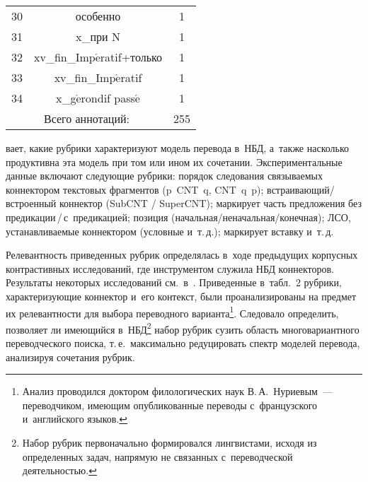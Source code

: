 \begin{multicols}{2}
\begin{center}
{\begin{tabular}{|c|c|c|}
  30&особенно&1\\
  31&x\_при N&1\\
  32&xv\_fin\_Imp$\acute{\mbox{e}}$ratif+только&1\\
  33&xv\_fin\_Imp$\acute{\mbox{e}}$ratif&1\\
  34&x\_g$\acute{\mbox{e}}$rondif pass$\acute{\mbox{e}}$&1\\
  \hline
  \multicolumn{2}{|c|}{Всего аннотаций:}&255\hphantom{99}\\
  \hline
  \end{tabular}
  }
  \vspace*{3pt}
  \end{center}

\noindent
вает, какие рубрики 
характеризуют модель перевода в~НБД, а~также насколько продуктивна эта 
модель при том или ином их сочетании. Экспериментальные данные 
включают следующие рубрики: порядок следования связываемых 
коннектором текстовых фрагментов (p~CNT~q, CNT~q~p); 
встраивающий/встроенный коннектор (SubCNT / SuperCNT); маркирует 
часть предложения без пре\-ди\-ка\-ции\,/\,с~пре\-ди\-ка\-ци\-ей; позиция  
(на\-чаль\-ная/не\-на\-чаль\-ная/ко\-неч\-ная); ЛСО, устанавливаемые 
коннектором (условные и~т.\,д.); маркирует вставку и~т.\,д.
  
  
Релевантность приведенных рубрик определялась в~ходе предыдущих 
корпусных контрастивных исследований, где инструментом служила НБД 
коннекторов. Результаты некоторых исследований см.\  
в~\cite{16-n, 17-n, 20-n}. Приведенные в~табл.~2 рубрики, характеризующие 
коннектор и~его контекст, были проанализированы на предмет их 
ре\-ле\-вант\-ности для выбора переводного варианта\footnote{Анализ проводился доктором 
филологических наук В.\,А.~Нуриевым~--- переводчиком, имеющим опубликованные переводы с~французского 
и~английского языков.}. Следовало определить, позволяет ли имеющийся 
в~НБД\footnote{Набор рубрик первоначально формировался лингвистами, исходя из определенных 
задач, напрямую не связанных с~переводческой деятельностью.} набор рубрик сузить область 
многовариантного переводческого поиска, т.\,е.\ максимально редуцировать 
спектр моделей перевода, анализируя сочетания руб\-рик.



\end{multicols}
